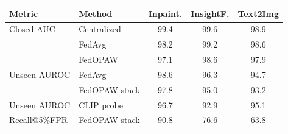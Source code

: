 \begin{tabular}{@{}llccc@{}}
\toprule
Metric & Method & Inpaint. & InsightF. & Text2Img \\
\midrule
Closed AUC & Centralized & 99.4 & 99.6 & 98.9 \\
& FedAvg & 98.2 & 99.2 & 98.6 \\
& FedOPAW & 97.1 & 98.6 & 97.9 \\
\midrule
Unseen AUROC & FedAvg & 98.6 & 96.3 & 94.7 \\
& FedOPAW stack & 97.8 & 95.0 & 93.2 \\
\midrule
Unseen AUROC & CLIP probe & 96.7 & 92.9 & 95.1 \\
Recall@5\%FPR & FedOPAW stack & 90.8 & 76.6 & 63.8 \\
\bottomrule
\end{tabular}
